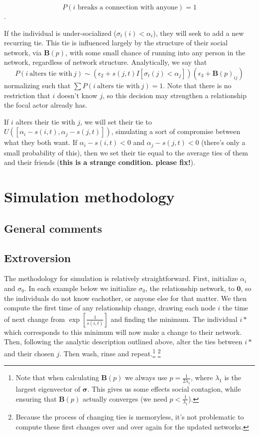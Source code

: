 \documentclass[]{article}
\begin{document}
	$$P(i\text{ breaks a connection with anyone}) = 1$$.
	
	If the individual is under-socialized ($\sigma_t(i) < \alpha_i$), they will seek to add a new recurring tie.
	This tie is influenced largely by the structure of their social network, via $\textbf{B}(p)$, with some small chance of running into any person in the network, regardless of network structure.
	Analytically, we say that
	\[
		P(i~\text{alters tie with}~j)
		 \sim
		( 
			\epsilon_2 + 
			s(j,t) I[ \sigma_t(j) < \alpha_j ] 
		)
		(
			\epsilon_3 +
			\textbf{B}(p)_{ij}
		)
	\]
	normalizing such that $\sum P(i~\text{alters tie with}~j) = 1$. Note that there is no restriction that $i$ doesn't know $j$, so this decision may strengthen a relationship the focal actor already has.
	
	If $i$ alters their tie with $j$, we will set their tie to $U( [\alpha_i - s(i,t), \alpha_j - s(j,t)] )$, simulating a sort of compromise between what they both want. If $\alpha_i - s(i,t) < 0$ and $\alpha_j - s(j,t) < 0$ (there's only a small probability of this), then we set their tie equal to the average ties of them and their friends (\textbf{this is a strange condition. please fix!}). 
	
	\section{Simulation methodology}
	\subsection{General comments}
	\subsection{Extroversion}
	The methodology for simulation is relatively straightforward.
	First, initialize ${\alpha_i}$ and $\sigma_0$.
	In each example below we initialize $\sigma_0$, the relationship network, to $\textbf{0}$, so the individuals do not know eachother, or anyone else for that matter.
	We then compute the first time of any relationship change, drawing each node $i$ the time of next change from $\exp\left[ \frac{1}{s(i,t)} \right]$ and finding the minimum. 
	The individual $i*$ which corresponds to this minimum will now make a change to their network.
	Then, following the analytic description outlined above, alter the ties between $i*$ and their chosen $j$. Then wash, rinse and repeat.\footnote{
		Note that when calculating $\textbf{B}(p)$ we always use $p = \frac{1}{2\lambda_1}$, where $\lambda_1$ is the largest eigenvector of $\boldsymbol{\sigma}$. This gives us some effects social contagion, while ensuring that $\textbf{B}(p)$ actually converges (we need $p < \frac{1}{\lambda_1}$).
	}
	\footnote{
	Because the process of changing ties is memoryless, it's not problematic to compute these first changes over and over again for the updated networks.
	}
	
\end{document}
